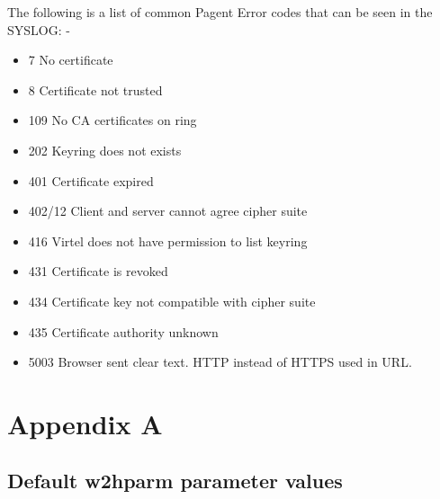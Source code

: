 \documentclass[letterpaper,10pt,english]{sphinxmanual}
\begin{document}
The following is a list of common Pagent Error codes that can be seen in the SYSLOG: -
\begin{itemize}
\item {} 
7      No certificate

\item {} 
8      Certificate not trusted

\item {} 
109    No CA certificates on ring

\item {} 
202    Keyring does not exists

\item {} 
401    Certificate expired

\item {} 
402/12 Client and server cannot agree cipher suite

\item {} 
416    Virtel does not have permission to list keyring

\item {} 
431    Certificate is revoked

\item {} 
434    Certificate key not compatible with cipher suite

\item {} 
435    Certificate authority unknown

\item {} 
5003   Browser sent clear text. HTTP instead of HTTPS used in URL.

\end{itemize}


\chapter{Appendix A}
\label{\detokenize{TN202002:appendix-a}}

\section{Default w2hparm parameter values}
\label{\detokenize{TN202002:default-w2hparm-parameter-values}}
\end{document}
